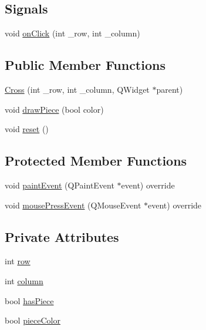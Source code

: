 \subsection*{Signals}
\begin{DoxyCompactItemize}
\item 
void \hyperlink{classCross_a3236a3d5b8df5df8360991c3c2c84151}{on\+Click} (int \+\_\+row, int \+\_\+column)
\end{DoxyCompactItemize}
\subsection*{Public Member Functions}
\begin{DoxyCompactItemize}
\item 
\hyperlink{classCross_a2c8a7e6d5023308aad6cf6adc03bcd40}{Cross} (int \+\_\+row, int \+\_\+column, Q\+Widget $\ast$parent)
\item 
void \hyperlink{classCross_a7a9c22df3681abcdf297ff6eae640f0a}{draw\+Piece} (bool color)
\item 
void \hyperlink{classCross_ae748d570f5e5a1e3427bd5866cc44118}{reset} ()
\end{DoxyCompactItemize}
\subsection*{Protected Member Functions}
\begin{DoxyCompactItemize}
\item 
void \hyperlink{classCross_ad12f50256807ced47283f96e4aebf997}{paint\+Event} (Q\+Paint\+Event $\ast$event) override
\item 
void \hyperlink{classCross_a45673e2233d66b8b094ddf201948cd98}{mouse\+Press\+Event} (Q\+Mouse\+Event $\ast$event) override
\end{DoxyCompactItemize}
\subsection*{Private Attributes}
\begin{DoxyCompactItemize}
\item 
int \hyperlink{classCross_a21935454e9ea07a0f2ec0bfe9338622c}{row}
\item 
int \hyperlink{classCross_a618536d0ef3121b0e2a8d74737e1a00c}{column}
\item 
bool \hyperlink{classCross_aa8369e751da4a7910bb552242ac19092}{has\+Piece}
\item 
bool \hyperlink{classCross_a7ed2b797ef98393f7096acda24e7e38f}{piece\+Color}
\end{DoxyCompactItemize}


